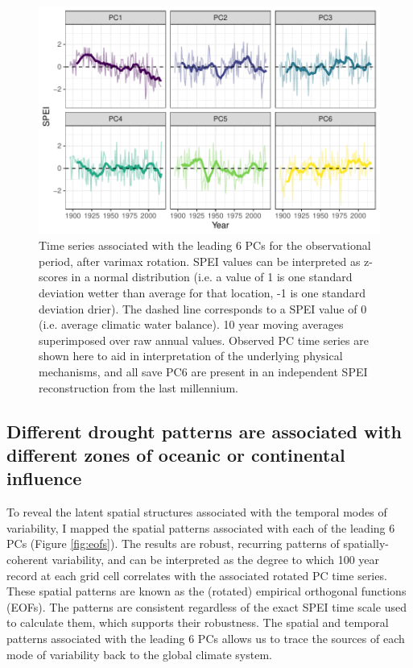 \documentclass[11pt]{iopart}
\begin{document}
\begin{figure}[!ht]
\centering
\includegraphics[width=.7\linewidth]{figures/pc_obs.pdf}
\caption{Time series associated with the leading 6 PCs for the observational period, after varimax rotation. SPEI values can be interpreted as z-scores in a normal distribution (i.e. a value of 1 is one standard deviation wetter than average for that location, -1 is one standard deviation drier). The dashed line corresponds to a SPEI value of 0 (i.e. average climatic water balance). 10 year moving averages superimposed over raw annual values. Observed PC time series are shown here to aid in interpretation of the underlying physical mechanisms, and all save PC6 are present in an independent SPEI reconstruction from the last millennium.}
\label{fig:pc-obs}
\end{figure}

\subsection*{Different drought patterns are associated with different zones of oceanic or continental influence}
To reveal the latent spatial structures associated with the temporal modes of variability, I mapped the spatial patterns associated with each of the leading 6 PCs (Figure \ref{fig:eofs}). The results are robust, recurring patterns of spatially-coherent variability, and can be interpreted as the degree to which 100 year record at each grid cell correlates with the associated rotated PC time series. These spatial patterns are known as the (rotated) empirical orthogonal functions (EOFs). The patterns are consistent regardless of the exact SPEI time scale used to calculate them, which supports their robustness. The spatial and temporal patterns associated with the leading 6 PCs allows us to trace the sources of each mode of variability back to the global climate system.
\end{document}
